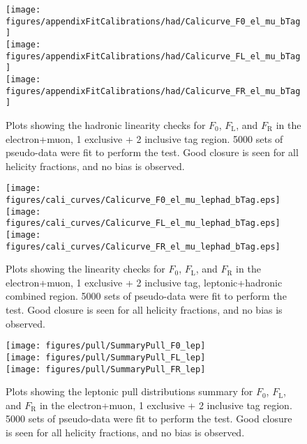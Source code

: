      \begin{figure}[!hb]    
      \begin{center}         
        \texttt{[image: figures/appendixFitCalibrations/had/Calicurve\_F0\_el\_mu\_bTag]}\\
        \texttt{[image: figures/appendixFitCalibrations/had/Calicurve\_FL\_el\_mu\_bTag]}\\
        \texttt{[image: figures/appendixFitCalibrations/had/Calicurve\_FR\_el\_mu\_bTag]}\\
        \caption{Plots showing the hadronic linearity checks for $F_{\text{0}}$, $F_{\text{L}}$, and $F_{\text{R}}$ in the electron+muon, 1 exclusive + 2 inclusive \bt tag region. 5000 sets of pseudo-data were fit to perform the test. Good closure is seen for all helicity fractions, and no bias is observed.}
	\label{fig:calibrationCurves_hadronic}
      \end{center}
     \end{figure}

     \begin{figure}[!hb]    
      \begin{center}         
        \texttt{[image: figures/cali\_curves/Calicurve\_F0\_el\_mu\_lephad\_bTag.eps]}\\
        \texttt{[image: figures/cali\_curves/Calicurve\_FL\_el\_mu\_lephad\_bTag.eps]}\\
        \texttt{[image: figures/cali\_curves/Calicurve\_FR\_el\_mu\_lephad\_bTag.eps]}\\
        \caption{Plots showing the linearity checks for $F_{\text{0}}$, $F_{\text{L}}$, and $F_{\text{R}}$ in the electron+muon, 1 exclusive + 2 inclusive \bt tag, leptonic+hadronic combined region. 5000 sets of pseudo-data were fit to perform the test. Good closure is seen for all helicity fractions, and no bias is observed.}
  \label{fig:calibrationCurves_hadronic}
      \end{center}
     \end{figure}

\begin{figure}[!hb]    
      \begin{center}         
        \texttt{[image: figures/pull/SummaryPull\_F0\_lep]}\\
        \texttt{[image: figures/pull/SummaryPull\_FL\_lep]}\\
        \texttt{[image: figures/pull/SummaryPull\_FR\_lep]}\\
        \caption{Plots showing the leptonic pull distributions summary for $F_{\text{0}}$, $F_{\text{L}}$, and $F_{\text{R}}$ in the electron+muon, 1 exclusive + 2 inclusive \bt tag region. 5000 sets of pseudo-data were fit to perform the test. Good closure is seen for all helicity fractions, and no bias is observed.}
  \label{fig:pull_leptonic}
  \end{center}
     \end{figure}

